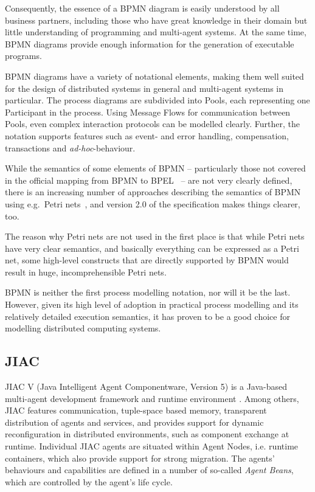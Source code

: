 Consequently, the essence of a BPMN diagram is easily understood by all business
partners, including those who have great knowledge in their domain but little
understanding of programming and multi-agent systems.  At the same time, BPMN
diagrams provide enough information for the generation of executable programs.

BPMN diagrams have a variety of notational elements, making them well suited for
the design of distributed systems in general and multi-agent systems in particular.
The process diagrams are subdivided into Pools, each representing one Participant
in the process.  Using Message Flows for communication between Pools, even complex
interaction protocols can be modelled clearly.  Further, the notation supports
features such as event- and error handling, compensation, transactions and
\emph{ad-hoc}-behaviour.

While the semantics of some elements of BPMN -- particularly those not covered in
the official mapping from BPMN to BPEL~\cite[Appendix A]{omg2009bpmn} -- are not
very clearly defined, there is an increasing number of approaches describing the
semantics of BPMN using e.g.\ Petri nets~\cite{dijkman2008formal}, and version
2.0 of the specification makes things clearer, too.


The reason why Petri nets are not used in the first place is that while Petri
nets have very clear semantics, and basically everything can be expressed as a
Petri net, some high-level constructs that are directly supported by BPMN would
result in huge, incomprehensible Petri nets.

BPMN is neither the first process modelling notation, nor will it be the last.
However, given its high level of adoption in practical process modelling
\cite{recker2008bpmnmodeling} and its relatively detailed execution semantics,
it has proven to be a good choice for modelling distributed computing systems.



\subsection{JIAC}
\label{sec:jiac}

JIAC V (Java Intelligent Agent Componentware, Version 5) is a Java-based
multi-agent development framework and runtime environment \cite{hirsch2009jiacv}.
Among others, JIAC features communication, tuple-space based memory, transparent
distribution of agents and services, and provides support for dynamic reconfiguration
in distributed environments, such as component exchange at runtime.  Individual
JIAC agents are situated within Agent Nodes, i.e. runtime containers, which also
provide support for strong migration.  The agents' behaviours and capabilities
are defined in a number of so-called \emph{Agent Beans}, which are controlled by
the agent's life cycle.

